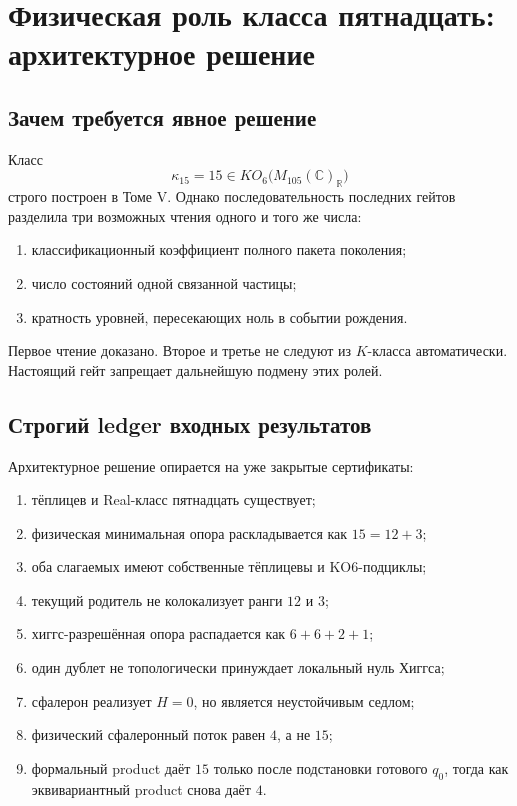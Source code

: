 \chapter{Физическая роль класса пятнадцать: архитектурное решение}
\label{ch:v6-spectral-transition-class15-physical-role-branch-decision-gate}

\section{Зачем требуется явное решение}

Класс
\begin{equation}
 \kappa_{15}=15\in KO_6
 \bigl(M_{105}(\mathbb C)_{\mathbb R}\bigr)
\end{equation}
строго построен в Томе V. Однако последовательность последних гейтов
разделила три возможных чтения одного и того же числа:
\begin{enumerate}
 \item классификационный коэффициент полного пакета поколения;
 \item число состояний одной связанной частицы;
 \item кратность уровней, пересекающих ноль в событии рождения.
\end{enumerate}
Первое чтение доказано. Второе и третье не следуют из $K$-класса
автоматически. Настоящий гейт запрещает дальнейшую подмену этих ролей.

\section{Строгий ledger входных результатов}

Архитектурное решение опирается на уже закрытые сертификаты:
\begin{enumerate}
 \item тёплицев и Real-класс пятнадцать существует;
 \item физическая минимальная опора раскладывается как $15=12+3$;
 \item оба слагаемых имеют собственные тёплицевы и KO6-подциклы;
 \item текущий родитель не колокализует ранги $12$ и $3$;
 \item хиггс-разрешённая опора распадается как $6+6+2+1$;
 \item один дублет не топологически принуждает локальный нуль Хиггса;
 \item сфалерон реализует $H=0$, но является неустойчивым седлом;
 \item физический сфалеронный поток равен $4$, а не $15$;
 \item формальный product даёт $15$ только после подстановки готового
 $q_0$, тогда как эквивариантный product снова даёт $4$.
\end{enumerate}

